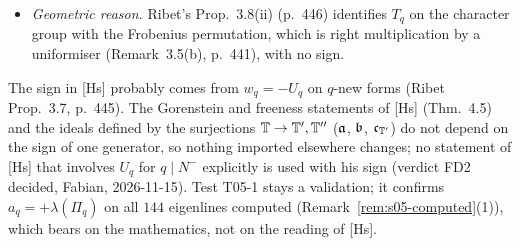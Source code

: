 \begin{remark}[Hsieh's $\mathrm{JL}(U_q)=-U_q$; FD2]
\begin{itemize}
  $4$ and $6$, so $\Pi_{11}$ is the identity on the class set (stage 01, Example ``$\Pi_{11}$ on $B_{11}$''). The form is $11a$ with
  $a_{11}=+1$ (split multiplicative reduction). So $U_{11}\mapsto+\Pi_{11}$ (Prop.~(b)).
\item \emph{Geometric reason.} Ribet's Prop.~3.8(ii) (p.~446) identifies $T_q$ on the character group with the Frobenius permutation,
  which is right multiplication by a uniformiser (Remark~3.5(b), p.~441), with no sign.
\end{itemize}
The sign in [Hs] probably comes from $w_q=-U_q$ on $q$-new forms (Ribet Prop.~3.7, p.~445). The Gorenstein and freeness statements
of [Hs] (Thm.~4.5) and the ideals defined by the surjections $\mathbb{T}\to\mathbb{T}',\mathbb{T}''$ ($\mathfrak{a}$, $\mathfrak{b}$, $\mathfrak{c}_{\mathbb{T}'}$) do not depend on the sign
of one generator, so nothing imported elsewhere changes; no statement of [Hs] that involves $U_q$ for $q\mid N^-$ explicitly is
used with his sign (verdict FD2 decided, Fabian, 2026-11-15). Test T05-1 stays a validation; it confirms $a_q=+\lambda(\Pi_q)$ on all $144$ eigenlines computed (Remark~\ref{rem:s05-computed}(1)), which bears on the mathematics, not on the reading of [Hs].
\end{remark}
